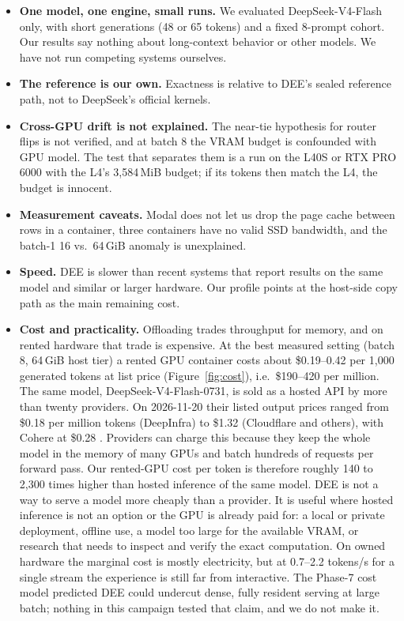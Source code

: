 \documentclass[11pt]{article}
\newcommand{\dee}{\textsc{DEE}}
\begin{document}
\begin{itemize}
\item \textbf{One model, one engine, small runs.} We evaluated DeepSeek-V4-Flash
only, with short generations (48 or 65 tokens) and a fixed 8-prompt cohort.
Our results say nothing about long-context behavior or other models. We have
not run competing systems ourselves.
\item \textbf{The reference is our own.} Exactness is relative to \dee{}'s
sealed reference path, not to DeepSeek's official kernels.
\item \textbf{Cross-GPU drift is not explained.} The near-tie hypothesis for
router flips is not verified, and at batch 8 the VRAM budget is confounded
with GPU model. The test that separates them is a run on the L40S or RTX PRO
6000 with the L4's 3,584\,MiB budget; if its tokens then match the L4, the
budget is innocent.
\item \textbf{Measurement caveats.} Modal does not let us drop the page cache
between rows in a container, three containers have no valid SSD bandwidth, and
the batch-1 16 vs.\ 64\,GiB anomaly is unexplained.
\item \textbf{Speed.} \dee{} is slower than recent systems that report results
on the same model and similar or larger hardware. Our profile points at the
host-side copy path as the main remaining cost.
\item \textbf{Cost and practicality.} Offloading trades throughput for memory,
and on rented hardware that trade is expensive. At the best measured setting
(batch 8, 64\,GiB host tier) a rented GPU container costs about \$0.19--0.42 per
1,000 generated tokens at list price (Figure~\ref{fig:cost}), i.e.\
\$190--420 per million. The same model, DeepSeek-V4-Flash-0731, is sold as a
hosted API by more than twenty providers. On 2026-11-20 their listed output
prices ranged from \$0.18 per million tokens (DeepInfra) to \$1.32 (Cloudflare
and others), with Cohere at \$0.28 \citep{openrouter2026dsv4}. Providers can
charge this because they keep the whole model in the memory of many GPUs and
batch hundreds of requests per forward pass. Our rented-GPU cost per token is
therefore roughly 140 to 2,300 times higher than hosted inference of the same
model. \dee{} is not a way to serve a model more cheaply than a
provider. It is useful where hosted inference is not an option or the GPU is
already paid for: a local or private deployment, offline use, a model too large
for the available VRAM, or research that needs to inspect and verify the
exact computation. On owned hardware the marginal cost is mostly electricity,
but at 0.7--2.2 tokens/s for a single stream the experience is still far from
interactive. The Phase-7 cost model predicted DEE could undercut dense,
fully resident serving at large batch; nothing in this campaign tested that
claim, and we do not make it.
\end{itemize}
\end{document}
